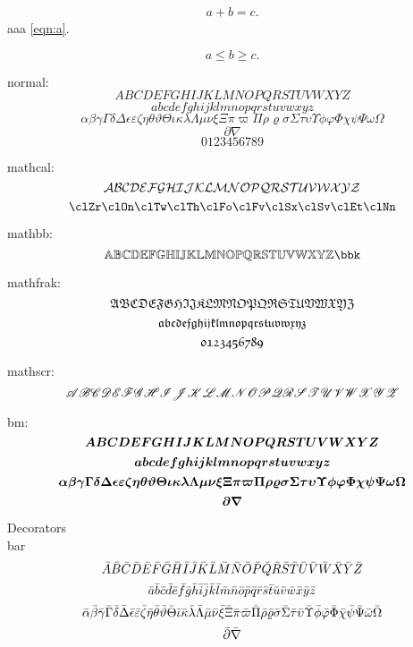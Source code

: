 \documentclass{article}
\begin{document}
\begin{align}
  a + b = c.
  \label{eqn:a}
\end{align}
aaa \eqref{eqn:a}.

\[
  a \le b \ge c.
\]

normal:
\[ A B C D E F G H I J K L M N O P Q R S T U V W X Y Z \]
\[ a b c d e f g h i j k l m n o p q r s t u v w x y z \]
\[ \alpha \beta \gamma \Gamma \delta \Delta \epsilon \varepsilon \zeta \eta \theta \vartheta \Theta \iota \kappa \lambda \Lambda \mu \nu \xi \Xi \pi \varpi \Pi \rho \varrho \sigma \Sigma \tau \upsilon \Upsilon \phi \varphi \Phi \chi \psi \Psi \omega \Omega \]
\[ \partial \nabla \]
\[0123456789\]

mathcal:
\[ \clA \clB \clC \clD \clE \clF \clG \clH \clI \clJ \clK \clL \clM \clN \clO \clP \clQ \clR \clS \clT \clU \clV \clW \clX \clY \clZ \]
\[ \clZr \clOn \clTw \clTh \clFo \clFv \clSx \clSv \clEt \clNn \] 

mathbb:
\[ \bbA \bbB \bbC \bbD \bbE \bbF \bbG \bbH \bbI \bbJ \bbK \bbL \bbM \bbN \bbO \bbP \bbQ \bbR \bbS \bbT \bbU \bbV \bbW \bbX \bbY \bbZ \bbk \]

mathfrak:
\[ \frA \frB \frC \frD \frE \frF \frG \frH \frI \frJ \frK \frL \frM \frN \frO \frP \frQ \frR \frS \frT \frU \frV \frW \frX \frY \frZ \]
\[ \fraa \frbb \frcc \frdd \free \frff \frgg \frhh \frii \frjj \frkk \frll \frmm \frnn \froo \frpp \frqq \frrr \frss \frtt \fruu \frvv \frww \frxx \fryy \frzz \]
\[ \frZr \frOn \frTw \frTh \frFo \frFv \frSx \frSv \frEt \frNn \]

mathscr:
\[ \scA \scB \scC \scD \scE \scF \scG \scH \scI \scJ \scK \scL \scM \scN \scO \scP \scQ \scR \scS \scT \scU \scV \scW \scX \scY \scZ \]

bm:
\[ \bmA \bmB \bmC \bmD \bmE \bmF \bmG \bmH \bmI \bmJ \bmK \bmL \bmM \bmN \bmO \bmP \bmQ \bmR \bmS \bmT \bmU \bmV \bmW \bmX \bmY \bmZ \]
\[ \bmaa \bmbb \bmcc \bmdd \bmee \bmff \bmgg \bmhh \bmii \bmjj \bmkk \bmll \bmmm \bmnn \bmoo \bmpp \bmqq \bmrr \bmss \bmtt \bmuu \bmvv \bmww \bmxx \bmyy \bmzz \]
\[ \bmalpha \bmbeta \bmgamma \bmGamma \bmdelta \bmDelta \bmepsilon \bmvarepsilon \bmzeta \bmeta \bmtheta \bmvartheta \bmTheta \bmiota \bmkappa \bmlambda \bmLambda \bmmu \bmnu \bmxi \bmXi \bmpi \bmvarpi \bmPi \bmrho \bmvarrho \bmsigma \bmSigma \bmtau \bmupsilon \bmUpsilon \bmphi \bmvarphi \bmPhi \bmchi \bmpsi \bmPsi \bmomega \bmOmega \]
\[ \bmpartial \bmnabla \]

Decorators\\

bar
\[ \Ab \Bb \Cb \Db \Eb \Fb \Gb \Hb \Ib \Jb \Kb \Lb \Mb \Nb \Ob \Pb \Qb \Rb \Sb \Tb \Ub \Vb \Wb \Xb \Yb \Zb \]
\[ \aab \bbb \ccb \ddb \eeb \ffb \ggb \hhb \iib \jjb \kkb \llb \mmb \nnb \oob \ppb \qqb \rrb \ssb \ttb \uub \vvb \wwb \xxb \yyb \zzb \]
\[ \alphab \betab \gammab \Gammab \deltab \Deltab \epsilonb \varepsilonb \zetab \etab \thetab \varthetab \Thetab \iotab \kappab \lambdab \Lambdab \mub \nub \xib \Xib \pib \varpib \Pib \rhob \varrhob \sigmab \Sigmab \taub \upsilonb \Upsilonb \phib \varphib \Phib \chib \psib \Psib \omegab \Omegab \]
\[ \partialb \nablab \]
\end{document}
